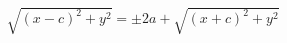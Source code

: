 \documentclass[preview]{standalone}
\begin{document}
\begin{align*}
\sqrt{(x-c)^2+y^2} = \pm 2a + \sqrt{(x+c)^2+y^2}
\end{align*}
\end{document}
